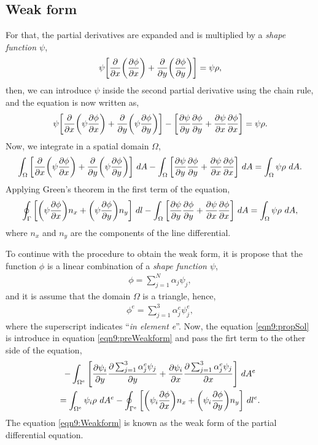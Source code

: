 \documentclass[main.tex]{subfiles}
\begin{document}
\subsection{Weak form}
For that, the partial derivatives are expanded and is multiplied by a \textit{shape function $\psi$},
\begin{gather*}
    \psi\qty[\pdv{x}\qty(\pdv{\phi}{x})+\pdv{y}\qty(\pdv{\phi}{y})] = \psi\rho,
\end{gather*}
then, we can introduce $\psi$ inside the second partial derivative using the chain rule, and the equation is now written as,
\begin{gather*}
    \psi\qty[\pdv{x}\qty(\psi\pdv{\phi}{x})+\pdv{y}\qty(\psi\pdv{\phi}{y})] - \qty[\pdv{\psi}{y}\pdv{\phi}{y}+\pdv{\psi}{x}\pdv{\phi}{x}] = \psi\rho.
\end{gather*}
Now, we integrate in a spatial domain $\Omega$,
\begin{gather*}
    \int_\Omega\qty[\pdv{x}\qty(\psi\pdv{\phi}{x})+\pdv{y}\qty(\psi\pdv{\phi}{y})]~dA - \int_\Omega\qty[\pdv{\psi}{y}\pdv{\phi}{y}+\pdv{\psi}{x}\pdv{\phi}{x}]~dA = \int_\Omega\psi\rho~dA.
\end{gather*}
Applying Green's theorem in the first term of the equation,
\begin{gather}
    \oint_\Gamma\qty[\qty(\psi\pdv{\phi}{x})n_x+\qty(\psi\pdv{\phi}{y})n_y]~dl
    - \int_\Omega\qty[\pdv{\psi}{y}\pdv{\phi}{y}+\pdv{\psi}{x}\pdv{\phi}{x}]~dA = \int_\Omega\psi\rho~dA\label{eqn9:preWeakform},
\end{gather}
where $n_x$ and $n_y$ are the components of the line differential.

To continue with the procedure to obtain the weak form, it is propose that the function $\phi$ is a linear combination of a \textit{shape function $\psi$},
\begin{gather*}
    \phi = \sum_{j=1}^{N}\alpha_{j}\psi_j,
\end{gather*}
and it is assume that the domain $\Omega$ is a triangle, hence,
\begin{gather}
    \phi^e = \sum_{j=1}^{3}\alpha^e_{j}\psi^e_j\label{eqn9:propSol},
\end{gather}
where the superscript indicates ``\textit{in element e}''.
Now, the equation \eqref{eqn9:propSol} is introduce in equation \eqref{eqn9:preWeakform} and pass the firt term to the other side of the equation,
\begin{multline}
    - \int_{\Omega^e}\qty[\pdv{\psi_i}{y}\pdv{\sum_{j=1}^{3}\alpha^e_{j}\psi_j}{y}+\pdv{\psi_i}{x}\pdv{\sum_{j=1}^{3}\alpha^e_{j}\psi_j}{x}]~dA^e
    \\
    = \int_{\Omega^e}\psi_i\rho~dA^e
    -\oint_{\Gamma^e}\qty[\qty(\psi_i\pdv{\phi}{x})n_x+\qty(\psi_i\pdv{\phi}{y})n_y]~dl^e\label{eqn9:Weakform}.
\end{multline}
The equation \eqref{eqn9:Weakform} is known as the weak form of the partial differential equation.
\end{document}
